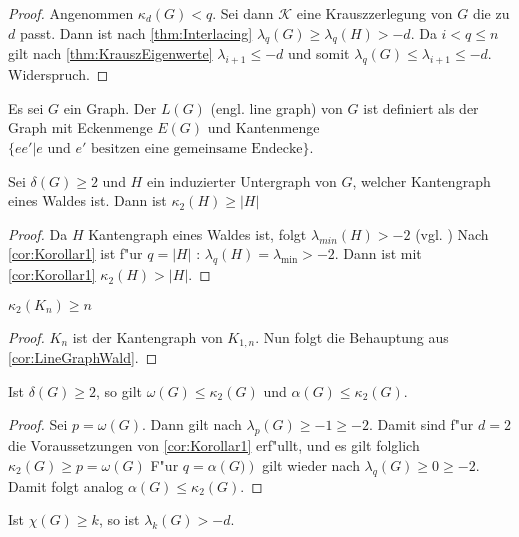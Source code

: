 \begin{proof}
  Angenommen $\kappa_d(G) < q$. Sei dann $\mathcal{K}$ eine Krauszzerlegung von $G$ die zu $d$ passt. Dann ist nach \ref{thm:Interlacing} $\lambda_{q}(G)\geq \lambda_{q}(H) > -d$. 
  Da $i < q \leq n$ gilt nach \ref{thm:KrauszEigenwerte} $\lambda_{i+1}\leq -d$ und somit $\lambda_{q}(G)\leq \lambda_{i+1} \leq -d$. Widerspruch.
\end{proof}
Es sei $G$ ein Graph. Der  $L(G)$ (engl. line graph) von $G$ ist definiert als der Graph mit Eckenmenge $E(G)$ und Kantenmenge $\{ee'|e\text{ und } e' \text{ besitzen eine gemeinsame Endecke}\}$.

\begin{corollary}
  \label{cor:LineGraphWald}
  Sei $\delta(G) \geq 2$ und $H$ ein induzierter Untergraph von $G$, welcher Kantengraph eines Waldes ist. 
  Dann ist $\kappa_{2}(H)\geq \left|H\right|$
\end{corollary}

\begin{proof}
  Da $H$ Kantengraph eines Waldes ist, folgt $\lambda_{min}(H) > -2$ (vgl. \cite[3.4.10]{zbMATH05625877}) 
  Nach \ref{cor:Korollar1} ist f"ur $q=\left|H\right|$ : $\lambda_q(H)=\lambda_{\text{min}}> -2$. Dann ist mit \ref{cor:Korollar1} $\kappa_{2}\left( H \right) > \left| H\right|$.
\end{proof}

\begin{corollary}[Klotz]
  $\kappa_{2}\left( K_n \right) \geq n$
\end{corollary}

\begin{proof}
  $K_n$ ist der Kantengraph von $K_{1,n}$. Nun folgt die Behauptung aus \ref{cor:LineGraphWald}.
\end{proof}
\begin{corollary}
  Ist $\delta\left( G \right) \geq 2$, so gilt $\omega\left( G \right)\leq \kappa_{2}\left( G \right)$ und $\alpha\left( G \right)\leq \kappa_{2}\left( G \right)$.
  \label{cor:alphaomegakrausz}
\end{corollary}

\begin{proof}
  Sei $p = \omega(G)$. Dann gilt nach $\lambda_{p}\left( G \right)\geq -1\geq -2$. Damit sind f"ur $d=2$ die Voraussetzungen von \ref{cor:Korollar1} erf"ullt, und es gilt folglich $\kappa_{2}\left( G \right)\geq p = \omega\left( G \right)$ 
  F"ur $q=\alpha\left( G) \right)$ gilt wieder nach $\lambda_{q}\left( G \right)\geq 0 \geq -2$. Damit folgt analog $\alpha\left( G \right) \leq \kappa_{2}\left( G \right)$.
\end{proof}
\begin{conjecture}
  \label{con:MainConjecture}
  Ist $\chi\left( G \right) \geq k$, so ist $\lambda_k\left( G \right) > -d$.
\end{conjecture}

